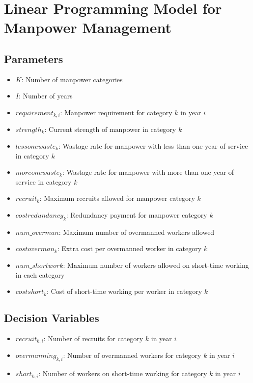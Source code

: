 \documentclass{article}
\begin{document}
\section*{Linear Programming Model for Manpower Management}

\subsection*{Parameters}
\begin{itemize}
    \item \( K \): Number of manpower categories
    \item \( I \): Number of years
    \item \( requirement_{k,i} \): Manpower requirement for category \( k \) in year \( i \)
    \item \( strength_k \): Current strength of manpower in category \( k \)
    \item \( lessonewaste_k \): Wastage rate for manpower with less than one year of service in category \( k \)
    \item \( moreonewaste_k \): Wastage rate for manpower with more than one year of service in category \( k \)
    \item \( recruit_k \): Maximum recruits allowed for manpower category \( k \)
    \item \( costredundancy_k \): Redundancy payment for manpower category \( k \)
    \item \( num\_overman \): Maximum number of overmanned workers allowed
    \item \( costoverman_k \): Extra cost per overmanned worker in category \( k \)
    \item \( num\_shortwork \): Maximum number of workers allowed on short-time working in each category
    \item \( costshort_k \): Cost of short-time working per worker in category \( k \)
\end{itemize}

\subsection*{Decision Variables}
\begin{itemize}
    \item \( recruit_{k,i} \): Number of recruits for category \( k \) in year \( i \)
    \item \( overmanning_{k,i} \): Number of overmanned workers for category \( k \) in year \( i \)
    \item \( short_{k,i} \): Number of workers on short-time working for category \( k \) in year \( i \)
\end{itemize}
\end{document}
